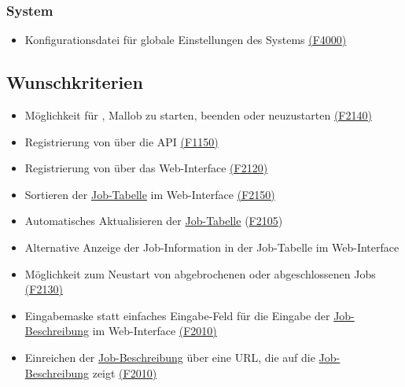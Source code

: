     \subsubsection{System}
        \begin{itemize}[noitemsep]
            \item \gls{Konfigurationsdatei} für globale Einstellungen des Systems \hyperref[FA:System:Einstellungen festlegen]{(F4000)}
        \end{itemize}
        
        
\subsection{Wunschkriterien}
    \begin{itemize}[noitemsep]
        \item Möglichkeit für , Mallob zu starten, beenden oder neuzustarten \hyperref[FA:Web-Interface:Verwalten von Malllob]{(F2140)}
        \item Registrierung von  über die \gls{API} \hyperref[FA:API:Registrierung von Nutzern]{(F1150)}
        \item Registrierung von  über das \gls{Web-Interface} \hyperref[FA:Web-Interface:Registrieren]{(F2120)}
        \item Sortieren der \hyperref[pages:job-table]{Job-Tabelle} im \gls{Web-Interface} \hyperref[FA:Web-Interface:Sortieren der Tabelle]{(F2150)}
        \item Automatisches Aktualisieren der \hyperref[pages:job-table]{Job-Tabelle} (\hyperref[FA:Web-Interface:Akutalisieren]{F2105})
        \item Alternative Anzeige der Job-Information in der Job-Tabelle im \gls{Web-Interface}
        \item Möglichkeit zum Neustart von abgebrochenen oder abgeschlossenen Jobs \hyperref[FA:Web-Interface:Neustart]{(F2130)}
        \item Eingabemaske statt einfaches Eingabe-Feld für die Eingabe der \hyperref[B:Job-Beschreibung]{Job-Beschreibung} im \gls{Web-Interface} \hyperref[FA:Web-Interface:Job einreichen]{(F2010)}
        \item Einreichen der \hyperref[B:Job-Beschreibung]{Job-Beschreibung} über eine \gls{URL}, die auf die \hyperref[B:Job-Beschreibung]{Job-Beschreibung} zeigt \hyperref[FA:Web-Interface:Job einreichen]{(F2010)}

\end{itemize}
